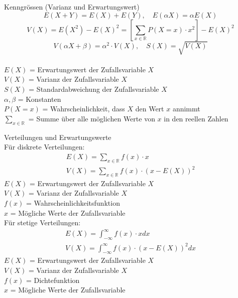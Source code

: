 \begin{concept}{Kenngrössen (Varianz und Erwartungswert)}\\
$$E(X + Y) = E(X) + E(Y), \quad E(\alpha X) = \alpha E(X)$$
$$V(X) = E(X^2) - E(X)^2 = \left[\sum_{x\in\mathbb{R}} P(X = x) \cdot x^2\right] - E(X)^2$$
$$V(\alpha X + \beta) = \alpha^2 \cdot V(X), \quad S(X) = \sqrt{V(X)}$$
\\
$E(X)$ = Erwartungswert der Zufallsvariable $X$\\
$V(X)$ = Varianz der Zufallsvariable $X$\\
$S(X)$ = Standardabweichung der Zufallsvariable $X$\\
$\alpha, \beta$ = Konstanten\\
$P(X = x)$ = Wahrscheinlichkeit, dass $X$ den Wert $x$ annimmt\\
$\sum_{x\in\mathbb{R}}$ = Summe über alle möglichen Werte von $x$ in den reellen Zahlen\\
\end{concept}
\begin{definition}{Verteilungen und Erwartungswerte}\\
Für diskrete Verteilungen:
$$
\begin{gathered}
E(X)=\sum_{x \in \mathbb{R}} f(x) \cdot x \\
V(X)=\sum_{x \in \mathbb{R}} f(x) \cdot(x-E(X))^2
\end{gathered}
$$
$E(X)$ = Erwartungswert der Zufallsvariable $X$\\
$V(X)$ = Varianz der Zufallsvariable $X$\\
$f(x)$ = Wahrscheinlichkeitsfunktion\\
$x$ = Mögliche Werte der Zufallsvariable\\

Für stetige Verteilungen:
$$
\begin{gathered}
E(X)=\int_{-\infty}^{\infty} f(x) \cdot x dx \\
V(X)=\int_{-\infty}^{\infty} f(x) \cdot(x-E(X))^2 dx
\end{gathered}
$$
$E(X)$ = Erwartungswert der Zufallsvariable $X$\\
$V(X)$ = Varianz der Zufallsvariable $X$\\
$f(x)$ = Dichtefunktion\\
$x$ = Mögliche Werte der Zufallsvariable\\
\end{definition}

